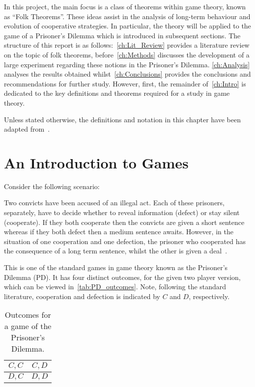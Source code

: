 In this project, the main focus is a
class of theorems within game theory, known as ``Folk Theorems''. These ideas
assist in the analysis of long-term behaviour and evolution of cooperative
strategies. In particular, the theory will be applied to the game of a
Prisoner's Dilemma which is introduced in subsequent sections. The structure of
this report is as follows:~\autoref{ch:Lit_Review} provides a literature review
on the topic of folk theorems, before~\autoref{ch:Methods} discusses the
development of a large experiment regarding these notions in the Prisoner's
Dilemma. \autoref{ch:Analysis} analyses the results obtained
whilst~\autoref{ch:Conclusions} provides the conclusions and recommendations for
further study. However, first, the remainder of~\autoref{ch:Intro} is dedicated
to the key definitions and theorems required for a study in game theory.

Unless stated otherwise, the definitions and notation in this chapter have been
adapted from~\cite{maschler_solan_zamir_2013}.

\section{An Introduction to Games}\label{sec:An_Intro_to_Games}
Consider the following scenario:

\begin{center}
    Two convicts have been accused of an illegal act. Each of these prisoners,
    separately, have to decide whether to reveal information (defect) or stay
    silent (cooperate). If they both cooperate then the convicts are given a
    short sentence whereas if they both defect then a medium sentence awaits.
    However, in the situation of one cooperation and one defection, the prisoner
    who cooperated has the consequence of a long term sentence, whilst the other
    is given a deal~\cite{Knight2017, maschler_solan_zamir_2013}.
\end{center}

This is one of the standard games in game theory known as the Prisoner's
Dilemma (PD). It has four distinct outcomes, for the given two player version,
which can be viewed in~\autoref{tab:PD_outcomes}. Note, following the standard
literature, cooperation and defection is indicated by \(C\) and \(D\), respectively.

\begin{table}
    \centering
    \begin{tabular}{c|c}
        \(C, C\) & \(C, D\) \\
        \midrule
        \(D, C\) & \(D, D\) \\
    \end{tabular}
    \caption{Outcomes for a game of the Prisoner's Dilemma.}\label{tab:PD_outcomes}
\end{table}

